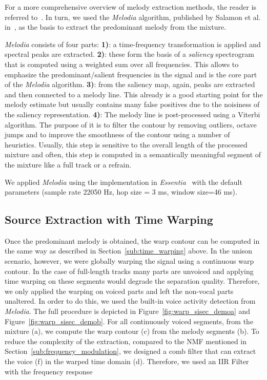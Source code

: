 For a more comprehensive overview of melody extraction methods, the reader is referred to~\cite{salamon14}.
In turn, we used the \emph{Melodia} algorithm, published by Salamon et al. in~\cite{salamon12}, as the basis to extract the predominant melody from the mixture.\par

\emph{Melodia} consists of four parts:
\noindent\textbf{1)}: a time-frequency transformation is applied and spectral peaks are extracted.
\textbf{2)}: these form the basis of a \emph{saliency} spectrogram that is computed using a weighted sum over all frequencies. This allows to emphasize the predominant/salient frequencies in the signal and is the core part of the \emph{Melodia} algorithm.
\textbf{3)}: from the saliency map, again, peaks are extracted and then connected to a melody line. This already is a good starting point for the melody estimate but usually contains many false positives due to the noisiness of the saliency representation.
\textbf{4)}: The melody line is post-processed using a Viterbi algorithm.
The purpose of it is to filter the contour by removing outliers, octave jumps and to improve the smoothness of the contour using a number of heuristics.
Usually, this step is sensitive to the overall length of the processed mixture and often, this step is computed in a semantically meaningful segment of the mixture like a full track or a refrain.
\par
We applied \emph{Melodia} using the implementation in \emph{Essentia}~\cite{bogdanov13} with the default parameters (sample rate 22050 Hz, hop size = 3 ms, window size=46 ms).

\subsection{Source Extraction with Time Warping}

Once the predominant melody is obtained, the warp contour can be computed in the same way as described in Section~\ref{sub:time_warping} above.
In the unison scenario, however, we were globally warping the signal using a continuous warp contour.
In the case of full-length tracks many parts are unvoiced and applying time warping on these segments would degrade the separation quality.
Therefore, we only applied the warping on voiced parts and left the non-vocal parts unaltered.
In order to do this, we used the built-in voice activity detection from \emph{Melodia}.
The full procedure is depicted in Figure~\ref{fig:warp_sisec_demoa} and Figure~\ref{fig:warp_sisec_demob}.
For all continuously voiced segments, from the mixture (a), we compute the warp contour (c) from the melody segments (b).
To reduce the complexity of the extraction, compared to the NMF mentioned in Section~\ref{sub:frequency_modulation}, we designed a comb filter that can extract the voice (f) in the warped time domain (d).
Therefore, we used an IIR Filter with the frequency response

